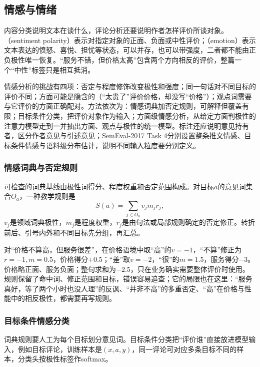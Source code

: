 \subsection{情感与情绪}
\label{sec:nlp-classification-sentiment}

内容分类说明文本在谈什么，评论分析还要说明作者怎样评价所谈对象。（sentiment polarity）表示对指定对象的正面、负面或中性评价；（emotion）表示文本表达的愤怒、喜悦、担忧等状态，可以并存，也可以带强度，二者都不能由正负极性唯一恢复。“服务不错，但价格太高”包含两个方向相反的评价，整篇一个“中性”标签只是相互抵消。

情感分析的挑战有四项：否定与程度修饰改变极性和强度；同一句话对不同目标的评价不同；方面可能是隐含的（“太贵了”评价价格，却没写“价格”）；观点词需要与它评价的方面正确配对。方法依次为：情感词典加否定规则，可解释但覆盖有限；目标条件分类，把评价对象作为输入；方面级情感分析，从给定方面判极性的注意力模型走到一并抽出方面、观点与极性的统一模型。标注还应说明意见持有者，区分作者意见与引述意见；SemEval-2017 Task 4分别设置整条推文情感、目标条件情感与语料级分布估计，说明不同输入粒度要分别定义。

\subsubsection{情感词典与否定规则}
\label{sec:nlp-classification-sentiment-lexicon}

可检查的词典基线由极性词得分、程度权重和否定范围构成。对目标$a$的意见词集合$O_a$，一种教学规则是
\[
  S(a)=\sum_{j\in O_a}v_jm_jr_j,
\]
$v_j$是领域词典极性，$m_j$是程度权重，$r_j$是由句法或局部规则确定的否定修正。转折前后、引号内外和不同目标先分组，再汇总。

对“价格不算高，但服务很差”，在价格语境中取“高”的$v=-1$，“不算”修正为$r=-1,m=0.5$，价格得分$+0.5$；“差”取$v=-2$，“很”的$m=1.5$，服务得分$-3$。价格略正面、服务负面；整句求和为$-2.5$，只在业务确实需要整体评价时使用。规则保留了命中词、修正范围和目标，错误容易追查；它的局限也在这里：“服务真好，等了两个小时也没人理”的反讽、“并非不高”的多重否定、“高”在价格与性能中的相反极性，都需要再写规则。

\subsubsection{目标条件情感分类}
\label{sec:nlp-classification-sentiment-bert}

词典规则要人工为每个目标划分意见词。目标条件分类把“评价谁”直接放进模型输入，例如\code{[CLS]}目标\code{[SEP]}评论\code{[SEP]}，训练样本是$(x,a,y)$，同一评论可对应多条目标不同的样本，分类头按极性标签作softmax。

